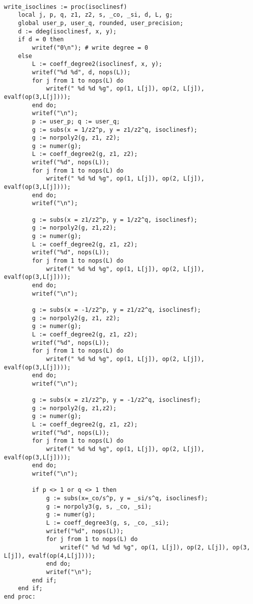 \documentclass[a4paper,10pt]{article}
\begin{document}
\begin{lstlisting}[name=writelog3]

write_isoclines := proc(isoclinesf)
    local j, p, q, z1, z2, s, _co, _si, d, L, g;
    global user_p, user_q, rounded, user_precision;
    d := ddeg(isoclinesf, x, y);
    if d = 0 then
        writef("0\n"); # write degree = 0
    else
        L := coeff_degree2(isoclinesf, x, y);
        writef("%d %d", d, nops(L));
        for j from 1 to nops(L) do
            writef(" %d %d %g", op(1, L[j]), op(2, L[j]), evalf(op(3,L[j])));
        end do;
        writef("\n");
        p := user_p; q := user_q;
        g := subs(x = 1/z2^p, y = z1/z2^q, isoclinesf);
        g := norpoly2(g, z1, z2);
        g := numer(g);
        L := coeff_degree2(g, z1, z2);
        writef("%d", nops(L));
        for j from 1 to nops(L) do
            writef(" %d %d %g", op(1, L[j]), op(2, L[j]), evalf(op(3,L[j])));
        end do;
        writef("\n");

        g := subs(x = z1/z2^p, y = 1/z2^q, isoclinesf);
        g := norpoly2(g, z1,z2);
        g := numer(g);
        L := coeff_degree2(g, z1, z2);
        writef("%d", nops(L));
        for j from 1 to nops(L) do
            writef(" %d %d %g", op(1, L[j]), op(2, L[j]), evalf(op(3,L[j])));
        end do;
        writef("\n");

        g := subs(x = -1/z2^p, y = z1/z2^q, isoclinesf);
        g := norpoly2(g, z1, z2);
        g := numer(g);
        L := coeff_degree2(g, z1, z2);
        writef("%d", nops(L));
        for j from 1 to nops(L) do
            writef(" %d %d %g", op(1, L[j]), op(2, L[j]), evalf(op(3,L[j])));
        end do;
        writef("\n");

        g := subs(x = z1/z2^p, y = -1/z2^q, isoclinesf);
        g := norpoly2(g, z1,z2);
        g := numer(g);
        L := coeff_degree2(g, z1, z2);
        writef("%d", nops(L));
        for j from 1 to nops(L) do
            writef(" %d %d %g", op(1, L[j]), op(2, L[j]), evalf(op(3,L[j])));
        end do;
        writef("\n");

        if p <> 1 or q <> 1 then
            g := subs(x=_co/s^p, y = _si/s^q, isoclinesf);
            g := norpoly3(g, s, _co, _si);
            g := numer(g);
            L := coeff_degree3(g, s, _co, _si);
            writef("%d", nops(L));
            for j from 1 to nops(L) do
                writef(" %d %d %d %g", op(1, L[j]), op(2, L[j]), op(3, L[j]), evalf(op(4,L[j])));
            end do;
            writef("\n");
        end if;
    end if;
end proc:
\end{lstlisting}
\end{document}
